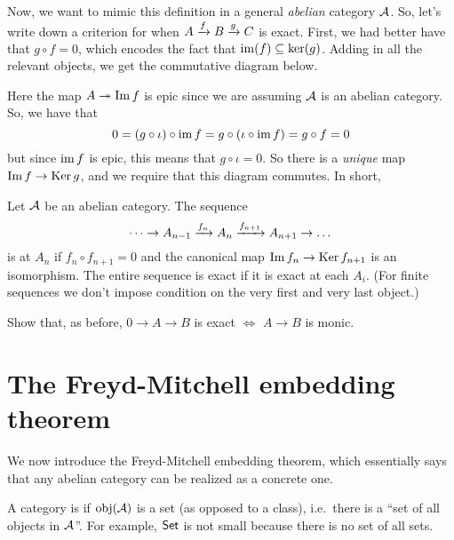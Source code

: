Now, we want to mimic this definition in a general \emph{abelian} category $\AA$.
So, let's write down a criterion for when $A \taking f B \taking g C$ is exact.
First, we had better have that $g \circ f = 0$,
which encodes the fact that $\img(f) \subseteq \ker(g)$.
Adding in all the relevant objects, we get the commutative diagram below.
\begin{center}
\end{center}
Here the map $A \surjto \Img f$ is epic since we are assuming $\AA$ is an abelian category.
So, we have that
\[ 0 = (g \circ \iota) \circ \img f = g \circ (\iota \circ \img f) = g \circ f = 0 \]
but since $\img f$ is epic, this means that $g \circ \iota = 0$.
So there is a \emph{unique} map $\Img f \to \Ker g$, and we require that this diagram commutes.
In short,
\begin{definition}
	Let $\AA$ be an abelian category. The sequence
	\[ \dots \to A_{n-1} \taking{f_n} A_n \taking{f_{n+1}} A_{n+1} \to \dots \]
	is  at $A_n$ if $f_n \circ f_{n+1} = 0$ and
	the canonical map $\Img f_n \to \Ker f_{n+1}$ is an isomorphism.
	The entire sequence is exact if it is exact at each $A_i$.
	(For finite sequences we don't impose condition on the very first and very last object.)
\end{definition}

\begin{exercise}
	Show that, as before, $0 \to A \to B$ is exact $\iff$ $A \to B$ is monic.
\end{exercise}

\section{The Freyd-Mitchell embedding theorem}
We now introduce the Freyd-Mitchell embedding theorem,
which essentially says that any abelian category can be realized as a concrete one.

\begin{definition}
	A category is  if $\obj(\AA)$ is a set (as opposed to a class),
	i.e.\ there is a ``set of all objects in $\AA$''.
	For example, $\catname{Set}$ is not small because there is no set of all sets.
\end{definition}

